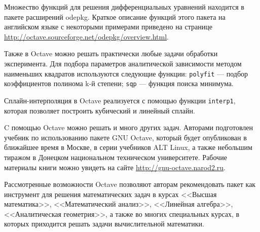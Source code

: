 \documentclass[10pt, a5paper]{article}
\begin{document}
Множество функций для решения дифференциальных уравнений находится в пакете расширений odepkg. Краткое описание функций этого пакета на английском языке с некоторыми примерами приведено на странице \url{http://octave.sourceforge.net/odepkg/overview.html}.

Также в Octave можно решать практически любые задачи обработки эксперимента. Для подбора параметров аналитической зависимости методом наименьших квадратов используются следующие функции: \verb!polyfit! --- подбор коэффициентов полинома k-й степени; \verb!sqp! --- функция поиска минимума.

Сплайн-интерполяция в Octave реализуется с помощью функции \verb!interp1!, которая позволяет  построить кубический и линейный сплайн.

C помощью Octave можно решать и много других задач. Авторами подготовлен учебник по использованию пакете GNU Octave, который будет опубликован в ближайшее время в Москве, в серии учебников ALT Linux, а также небольшим тиражом в Донецком национальном техническом университете. Рабочие материалы книги можно увидеть на сайте \url{http://gnu-octave.narod2.ru}.

Рассмотренные возможности Octave позволяют авторам рекомендовать пакет как инструмент для решения математических задач в курсах <<Высшая математика>>, <<Математический анализ>>, <<Линейная алгебра>>, <<Аналитическая геометрия>>, а также во многих специальных курсах, в которых приходится решать задачи вычислительной математики.
\end{document}
